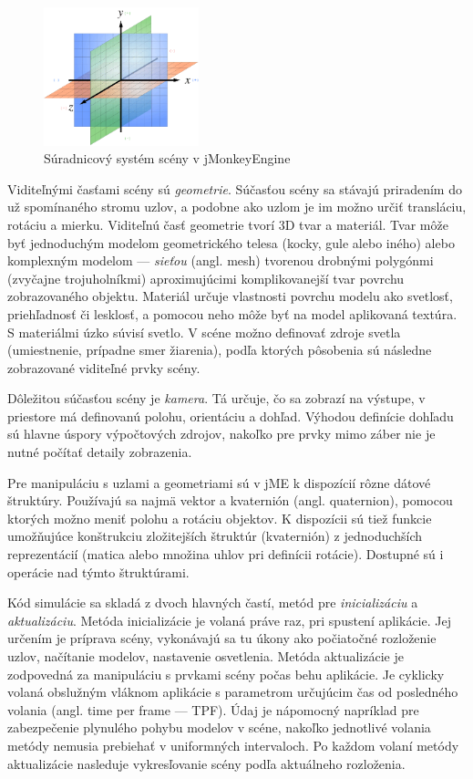 \begin{figure}
\centerline{\includegraphics[width=0.4\textwidth]{images/coordinate-system}}
\caption[Súradnicový systém scény v jMonkeyEngine]{Súradnicový systém scény v jMonkeyEngine}
\label{obr:coordinate-system}
\end{figure}

Viditeľnými časťami scény sú \textit{geometrie}. Súčasťou scény sa stávajú priradením do už spomínaného stromu uzlov, a podobne ako uzlom je im možno určiť transláciu, rotáciu a mierku. Viditeľnú časť geometrie tvorí 3D tvar a materiál. Tvar môže byť jednoduchým modelom geometrického telesa (kocky, gule alebo iného) alebo komplexným modelom --- \textit{sieťou} (angl. mesh) tvorenou drobnými polygónmi (zvyčajne trojuholníkmi) aproximujúcimi komplikovanejší tvar povrchu zobrazovaného objektu. Materiál určuje vlastnosti povrchu modelu ako svetlosť, priehľadnosť či lesklosť, a pomocou neho môže byť na model aplikovaná textúra. S materiálmi úzko súvisí svetlo. V scéne možno definovať zdroje svetla (umiestnenie, prípadne smer žiarenia), podľa ktorých pôsobenia sú následne zobrazované viditeľné prvky scény.

Dôležitou súčasťou scény je \textit{kamera}. Tá určuje, čo sa zobrazí na výstupe, v priestore má definovanú polohu, orientáciu a dohľad. Výhodou definície dohľadu sú hlavne úspory výpočtových zdrojov, nakoľko pre prvky mimo záber nie je nutné počítať detaily zobrazenia.

Pre manipuláciu s uzlami a geometriami sú v jME k dispozícií rôzne dátové štruktúry. Používajú sa najmä vektor a kvaternión (angl. quaternion), pomocou ktorých možno meniť polohu a rotáciu objektov. K dispozícii sú tiež funkcie umožňujúce konštrukciu zložitejších štruktúr (kvaternión) z jednoduchších reprezentácií (matica alebo množina uhlov pri definícii rotácie). Dostupné sú i operácie nad týmto štruktúrami.

Kód simulácie sa skladá z dvoch hlavných častí, metód pre \textit{inicializáciu} a \textit{aktualizáciu}. Metóda inicializácie je volaná práve raz, pri spustení aplikácie. Jej určením je príprava scény, vykonávajú sa tu úkony ako počiatočné rozloženie uzlov, načítanie modelov, nastavenie osvetlenia. Metóda aktualizácie je zodpovedná za manipuláciu s prvkami scény počas behu aplikácie. Je cyklicky volaná obslužným vláknom aplikácie s parametrom určujúcim čas od posledného volania (angl. time per frame --- TPF). Údaj je nápomocný napríklad pre zabezpečenie plynulého pohybu modelov v scéne, nakoľko jednotlivé volania metódy nemusia prebiehať v uniformných intervaloch. Po každom volaní metódy aktualizácie nasleduje vykresľovanie scény podľa aktuálneho rozloženia.

